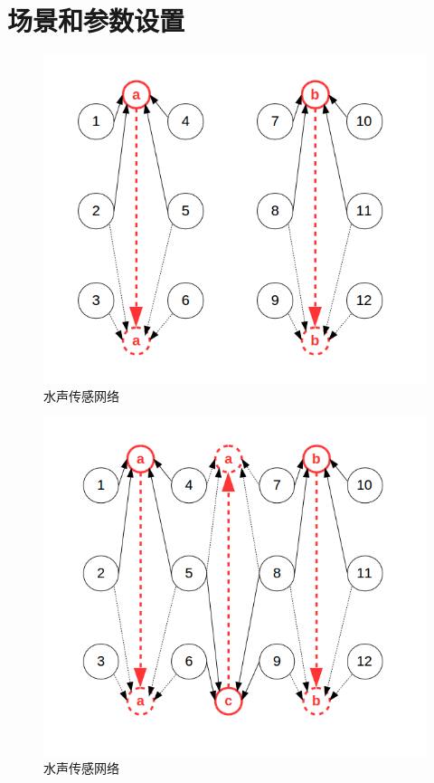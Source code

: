 \section {场景和参数设置}
 \begin{figure}[ht]
 	\centering
 	\includegraphics[scale=0.5]{figures/2scen.png}
 	\caption{
 		水声传感网络
 	}
 	\label{fig:example}
 \end{figure}
 
  \begin{figure}[ht]
  	\centering
  	\includegraphics[scale=0.5]{figures/3scen.png}
  	\caption{
  		水声传感网络
  	}
  	\label{fig:example}
  \end{figure}
  

